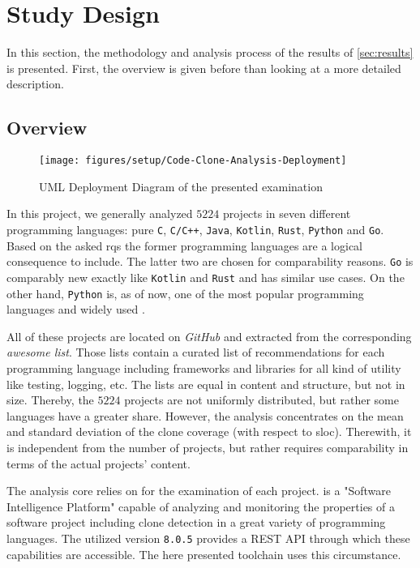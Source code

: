 
\section{Study Design}
\label{sec:study_design}

In this section, the methodology and analysis process of the results of \autoref{sec:results} is presented. First, the overview is given before than looking at a more detailed description.


\subsection{Overview}

\begin{figure}[tbh]
	\centering
	\texttt{[image: figures/setup/Code-Clone-Analysis-Deployment]}
	\caption{UML Deployment Diagram of the presented examination}
	\label{fig:overview_deployment}
\end{figure}

In this project, we generally analyzed $5224$ projects in seven different programming languages: pure \texttt{C}, \texttt{C/C++}, \texttt{Java}, \texttt{Kotlin}, \texttt{Rust}, \texttt{Python} and \texttt{Go}. Based on the asked \acp{rq} the former programming languages are a logical consequence to include. The latter two are chosen for comparability reasons. \texttt{Go} is comparably new exactly like \texttt{Kotlin} and \texttt{Rust} and has similar use cases. On the other hand, \texttt{Python} is, as of now, one of the most popular programming languages and widely used \cite{stackoverflow2021languages}.

All of these projects are located on \textit{GitHub} and extracted from the corresponding \textit{awesome list}\awesomeFootnote{}. Those lists contain a curated list of recommendations for each programming language including frameworks and libraries for all kind of utility like testing, logging, etc.
The lists are equal in content and structure, but not in size. Thereby, the $5224$ projects are not uniformly distributed, but rather some languages have a greater share. However, the analysis concentrates on the mean and standard deviation of the clone coverage (with respect to \ac{sloc}). Therewith, it is independent from the number of projects, but rather requires comparability in terms of the actual projects' content.

The analysis core relies on \teamscale{}\teamscaleFootnote{} for the examination of each project. \teamscale{} is a "Software Intelligence Platform" capable of analyzing and monitoring the properties of a software project including clone detection in a great variety of programming languages. The utilized version \texttt{8.0.5} provides a REST API through which these capabilities are accessible. The here presented toolchain uses this circumstance.

